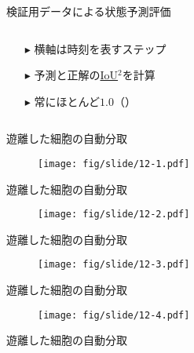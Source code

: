 \begin{frame}{検証用データによる状態予測評価}
\begin{columns}
\begin{column}{.4\linewidth}
\begin{itemize}
                \item[$\blacktriangleright$] 横軸は時刻を表すステップ
                \item[$\blacktriangleright$] 予測と正解の\uline{IoU}$^2$を計算
                \item[$\blacktriangleright$] 常にほとんど$1.0$（）
            \end{itemize}
        \end{column}
    \end{columns}
    \vspace{0.5zh}
    \setcounter{footnote}{2}
\end{frame}

\begin{frame}{遊離した細胞の自動分取}
    \begin{figure}[t]
        \centering
        \texttt{[image: fig/slide/12-1.pdf]}
    \end{figure}
\end{frame}
\begin{frame}[noframenumbering]{遊離した細胞の自動分取}
    \begin{figure}[t]
        \centering
        \texttt{[image: fig/slide/12-2.pdf]}
    \end{figure}
\end{frame}
\begin{frame}[noframenumbering]{遊離した細胞の自動分取}
    \begin{figure}[t]
        \centering
        \texttt{[image: fig/slide/12-3.pdf]}
    \end{figure}
\end{frame}
\begin{frame}[noframenumbering]{遊離した細胞の自動分取}
    \begin{figure}[t]
        \centering
        \texttt{[image: fig/slide/12-4.pdf]}
    \end{figure}
\end{frame}
\begin{frame}[noframenumbering]{遊離した細胞の自動分取}
    \begin{figure}
    \end{figure}
\end{frame}

